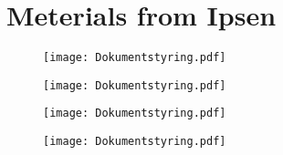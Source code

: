 \chapter{Meterials from Ipsen} \label{bilag:PiasPPT}
\begin{figure}[H]
	\centering
	\texttt{[image: Dokumentstyring.pdf]}
\end{figure}
\begin{figure}[H]
	\centering
	\texttt{[image: Dokumentstyring.pdf]}
\end{figure}
\newpage
\begin{figure}[H]
	\centering
	\texttt{[image: Dokumentstyring.pdf]}
\end{figure}
\begin{figure}[H]
	\centering
	\texttt{[image: Dokumentstyring.pdf]}
\end{figure}


%
